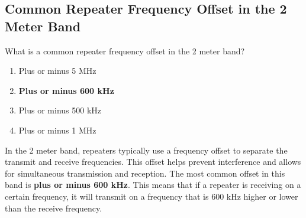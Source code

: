 \subsection{Common Repeater Frequency Offset in the 2 Meter Band}
\label{T2A01}

\begin{tcolorbox}[colback=gray!10!white,colframe=black!75!black,title=T2A01]
What is a common repeater frequency offset in the 2 meter band?
\begin{enumerate}[noitemsep]
    \item Plus or minus 5 MHz
    \item \textbf{Plus or minus 600 kHz}
    \item Plus or minus 500 kHz
    \item Plus or minus 1 MHz
\end{enumerate}
\end{tcolorbox}

In the 2 meter band, repeaters typically use a frequency offset to separate the transmit and receive frequencies. This offset helps prevent interference and allows for simultaneous transmission and reception. The most common offset in this band is \textbf{plus or minus 600 kHz}. This means that if a repeater is receiving on a certain frequency, it will transmit on a frequency that is 600 kHz higher or lower than the receive frequency.